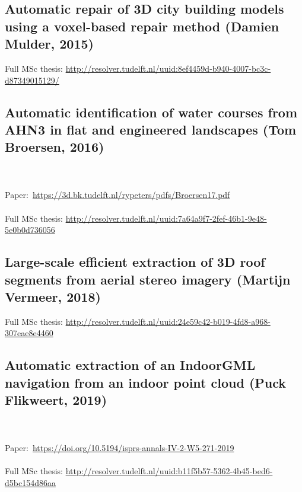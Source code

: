 \subsection{Automatic repair of 3D city building models using a voxel-based repair method (Damien Mulder, 2015)}

\begin{kaobox}[frametitle=\faExternalLink\ To read or to watch.]
Full MSc thesis: \url{http://resolver.tudelft.nl/uuid:8ef4459d-b940-4007-bc3c-d87349015129/}
\end{kaobox}

\subsection{Automatic identification of water courses from AHN3 in flat and engineered landscapes (Tom Broersen, 2016)}

\begin{kaobox}[frametitle=\faExternalLink\ To read or to watch.]
\\ \\
Paper:\ \url{https://3d.bk.tudelft.nl/rypeters/pdfs/Broersen17.pdf}
\\ \\
Full MSc thesis: \url{http://resolver.tudelft.nl/uuid:7a64a9f7-2fef-46b1-9e48-5e0b0d736056}
\end{kaobox}

\subsection{Large-scale efficient extraction of 3D roof segments from aerial stereo imagery (Martijn Vermeer, 2018)}

\begin{kaobox}[frametitle=\faExternalLink\ To read or to watch.]
Full MSc thesis: \url{http://resolver.tudelft.nl/uuid:24e59c42-b019-4fd8-a968-307eae8e4460}
\end{kaobox}

\subsection{Automatic extraction of an IndoorGML navigation from an indoor point cloud (Puck Flikweert, 2019)}

\begin{kaobox}[frametitle=\faExternalLink\ To read or to watch.]
\\ \\
Paper:\ \url{https://doi.org/10.5194/isprs-annals-IV-2-W5-271-2019}
\\ \\
Full MSc thesis: \url{http://resolver.tudelft.nl/uuid:b11f5b57-5362-4b45-bed6-d5bc154d86aa}
\end{kaobox}

